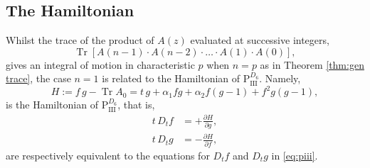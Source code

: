 \documentclass[a4paper,reqno]{amsart}
\numberwithin{equation}{section}
\numberwithin{figure}{section}
\theoremstyle{remark}
\newcommand\Pthree{\textrm{P}_{\textrm{III}}}
\begin{document}
\subsection{The Hamiltonian}Whilst the trace of the product of $A(z)$ evaluated at successive integers,
$$\operatorname{Tr}[A(n-1)\cdot A(n-2)\cdot\ldots\cdot A(1)\cdot A(0)],$$
gives an integral of motion in characteristic $p$ when $n=p$ as in Theorem \ref{thm:gen trace}, the case $n=1$ is related to the Hamiltonian of $\Pthree^{D_6}$. Namely,
\begin{equation*}
    H:=f\,g-\operatorname{Tr}A_0=t\,g+\alpha_1 f g+\alpha_2f(g-1)+f^2g(g-1),
\end{equation*}
is the Hamiltonian of $\Pthree^{D_6}$, that is,
\begin{align*}
    t\,D_tf&=+\frac{\partial H}{\partial g},\\
    t\,D_tg&=-\frac{\partial H}{\partial f},
\end{align*}
are respectively equivalent to the equations for $D_tf$ and $D_tg$ in \eqref{eq:piii}.
\end{document}

